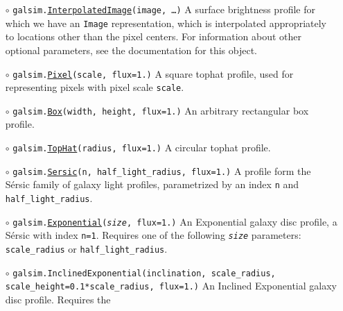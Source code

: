 \documentclass[preprint,10pt]{../../devel/modules/aastex}
\begin{document}
\begin{itemize}
\item[$\circ$]
  \texttt{galsim.}\href{http://galsim-developers.github.io/GalSim/classgalsim_1_1interpolatedimage_1_1_interpolated_image.html}{\texttt{InterpolatedImage}}\texttt{(image, \dots)}
    \newline
    A surface brightness profile for which we have an \texttt{Image} representation,
    which is interpolated appropriately to locations other than the pixel centers.
    For information about other optional parameters, see the documentation for this object.
\item[$\circ$]
  \texttt{galsim.}\href{http://galsim-developers.github.com/GalSim/classgalsim_1_1base_1_1_pixel.html}{\texttt{Pixel}}\texttt{(scale, flux=1.)}
    \newline
    A square tophat profile, used for representing pixels with pixel scale \texttt{scale}.
\item[$\circ$]
  \texttt{galsim.}\href{http://galsim-developers.github.com/GalSim/classgalsim_1_1base_1_1_box.html}{\texttt{Box}}\texttt{(width, height, flux=1.)}
    \newline
    An arbitrary rectangular box profile.
\item[$\circ$]
  \texttt{galsim.}\href{http://galsim-developers.github.io/GalSim/classgalsim_1_1base_1_1_top_hat.html}{\texttt{TopHat}}\texttt{(radius, flux=1.)}
    \newline
    A circular tophat profile.
\item[$\circ$]
  \texttt{galsim.}\href{http://galsim-developers.github.com/GalSim/classgalsim_1_1base_1_1_sersic.html}{\texttt{Sersic}}\texttt{(n, half\_light\_radius, flux=1.)}
    \newline
    A profile form the S\'{e}rsic family of galaxy light
    profiles, parametrized by an index \texttt{n} and \texttt{half\_light\_radius}.
\item[$\circ$]
  \texttt{galsim.}\href{http://galsim-developers.github.com/GalSim/classgalsim_1_1base_1_1_exponential.html}{\texttt{Exponential}}\texttt{(\emph{size}, flux=1.)}
    \newline
    An Exponential galaxy disc profile, a S\'{e}rsic
    with index \texttt{n=1}.  Requires one of the
    following \texttt{\emph{size}} parameters: \texttt{scale\_radius} or \texttt{half\_light\_radius}.
\item[$\circ$]
  \texttt{galsim.}\texttt{InclinedExponential}\texttt{(inclination, scale\_radius, scale\_height=0.1*scale\_radius, flux=1.)}
    \newline
    An Inclined Exponential galaxy disc profile. Requires the

\end{itemize}
\end{document}
